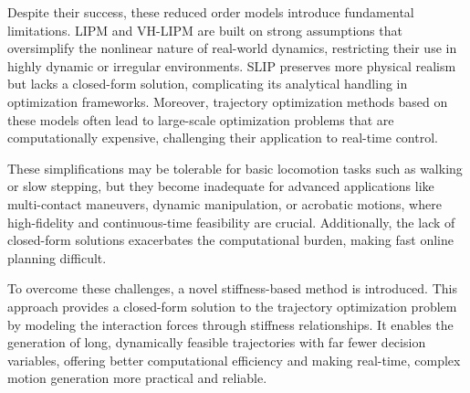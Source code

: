 \documentclass[main.tex]{subfiles}
\begin{document}
Despite their success, these reduced order models introduce fundamental limitations. LIPM and VH-LIPM are built on strong assumptions that oversimplify the nonlinear nature of real-world dynamics, restricting their use in highly dynamic or irregular environments. SLIP preserves more physical realism but lacks a closed-form solution, complicating its analytical handling in optimization frameworks. Moreover, trajectory optimization methods based on these models often lead to large-scale optimization problems that are computationally expensive, challenging their application to real-time control.

These simplifications may be tolerable for basic locomotion tasks such as walking or slow stepping, but they become inadequate for advanced applications like multi-contact maneuvers, dynamic manipulation, or acrobatic motions, where high-fidelity and continuous-time feasibility are crucial. Additionally, the lack of closed-form solutions exacerbates the computational burden, making fast online planning difficult.

To overcome these challenges, a novel stiffness-based method is introduced. This approach provides a closed-form solution to the trajectory optimization problem by modeling the interaction forces through stiffness relationships. It enables the generation of long, dynamically feasible trajectories with far fewer decision variables, offering better computational efficiency and making real-time, complex motion generation more practical and reliable.
\end{document}
